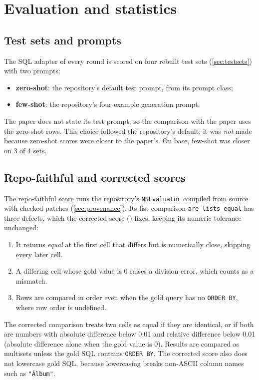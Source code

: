\section{Evaluation and statistics}\label{sec:scoring}

\subsection{Test sets and prompts}

The SQL adapter of every round is scored on four rebuilt test sets (\cref{sec:testsets}) with two prompts:
\begin{itemize}
\item \textbf{zero-shot}: the repository's default test prompt, from its prompt class;
\item \textbf{few-shot}: the repository's four-example generation prompt.
\end{itemize}
The paper does not state its test prompt, so the comparison with the paper uses the zero-shot rows. This choice
followed the repository's default; it was \emph{not} made because zero-shot scores were closer to the paper's. On base,
few-shot was closer on 3 of 4 sets.

\subsection{Repo-faithful and corrected scores}

The repo-faithful score runs the repository's \texttt{NSEvaluator} compiled from source with checked patches
(\cref{sec:provenance}). Its list comparison \texttt{are\_lists\_equal} has three defects, which the corrected score
() fixes, keeping its numeric tolerance unchanged:
\begin{enumerate}
\item It returns \emph{equal} at the first cell that differs but is numerically close, skipping every later cell.
\item A differing cell whose gold value is 0 raises a division error, which counts as a mismatch.
\item Rows are compared in order even when the gold query has no \texttt{ORDER BY}, where row order is undefined.
\end{enumerate}
The corrected comparison treats two cells as equal if they are identical, or if both are numbers with absolute
difference below 0.01 and relative difference below 0.01 (absolute difference alone when the gold value is 0). Results
are compared as multisets unless the gold SQL contains \texttt{ORDER BY}. The corrected score also does not lowercase
gold SQL, because lowercasing breaks non-ASCII column names such as \texttt{"Álbum"}.

